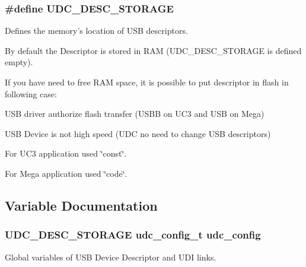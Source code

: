 \label{group__udc__desc__group_ga1659a2f0b429f07a985a8faaa3fb27b1}
\hypertarget{group__udc__desc__group_gae086959cec07a2e71ab069e25a51764f}{
\subsubsection[{\-U\-D\-C\-\_\-\-D\-E\-S\-C\-\_\-\-S\-T\-O\-R\-A\-G\-E}]{\setlength{\rightskip}{0pt plus 5cm}\#define \-U\-D\-C\-\_\-\-D\-E\-S\-C\-\_\-\-S\-T\-O\-R\-A\-G\-E}}
\label{group__udc__desc__group_gae086959cec07a2e71ab069e25a51764f}


\-Defines the memory's location of \-U\-S\-B descriptors. 

\-By default the \-Descriptor is stored in \-R\-A\-M (\-U\-D\-C\-\_\-\-D\-E\-S\-C\-\_\-\-S\-T\-O\-R\-A\-G\-E is defined empty).

\-If you have need to free \-R\-A\-M space, it is possible to put descriptor in flash in following case\-:
\begin{DoxyItemize}
\item \-U\-S\-B driver authorize flash transfer (\-U\-S\-B\-B on \-U\-C3 and \-U\-S\-B on \-Mega)
\item \-U\-S\-B \-Device is not high speed (\-U\-D\-C no need to change \-U\-S\-B descriptors)
\end{DoxyItemize}

\-For \-U\-C3 application used \char`\"{}const\char`\"{}.

\-For \-Mega application used \char`\"{}code\char`\"{}. 

\subsection{\-Variable \-Documentation}
\hypertarget{group__udc__desc__group_ga40ae5a61fbfa7e289136b2f9fd190217}{
\subsubsection[{udc\-\_\-config}]{\setlength{\rightskip}{0pt plus 5cm}\-U\-D\-C\-\_\-\-D\-E\-S\-C\-\_\-\-S\-T\-O\-R\-A\-G\-E {\bf udc\-\_\-config\-\_\-t} {\bf udc\-\_\-config}}}
\label{group__udc__desc__group_ga40ae5a61fbfa7e289136b2f9fd190217}


\-Global variables of \-U\-S\-B \-Device \-Descriptor and \-U\-D\-I links. 

